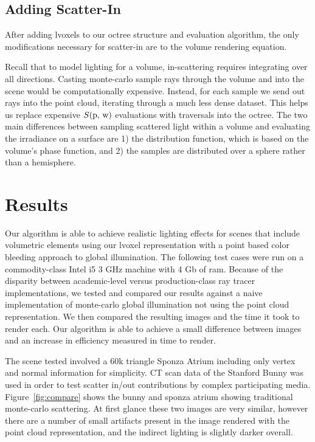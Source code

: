 \documentclass[runningheads]{llncs}
\begin{document}
\subsection{Adding Scatter-In}
\label{scatterin_sec}
After adding lvoxels to our octree structure and evaluation algorithm, the only modifications necessary for scatter-in are to the volume rendering equation.  

Recall that to model lighting for a volume, in-scattering requires integrating over all directions.  Casting monte-carlo sample rays through the volume and into the scene would be computationally expensive.  Instead, for each sample we send out rays into the point cloud, iterating through a much less dense dataset.  This helps us replace expensive $S(\textup{p, w})$ evaluations with traversals into the octree.  The two main differences between sampling scattered light within a volume and evaluating the irradiance on a surface are 1) the distribution function, which is based on the volume's phase function, and 2) the samples are distributed over a sphere rather than a hemisphere.


\section{Results}
Our algorithm is able to achieve realistic lighting effects for scenes that include volumetric elements using our lvoxel representation with a point based color bleeding approach to global illumination.
The following test cases were run on a commodity-class Intel i5 3 GHz machine with 4 Gb of ram.  Because of the disparity between academic-level versus production-class ray tracer implementations, we tested and compared our results against a naive implementation of monte-carlo global illumination not using the point cloud representation.  We then compared the resulting images and the time it took to render each.  Our algorithm is able to achieve a small difference between images and an increase in efficiency measured in time to render.

The scene tested involved a 60k triangle Sponza Atrium including only vertex and normal information for simplicity.  CT scan data of the Stanford Bunny was used in order to test scatter in/out contributions by complex participating media.
Figure~\ref{fig:compare} shows the bunny and sponza atrium showing traditional monte-carlo scattering.  At first glance these two images are very similar, however there are a number of small artifacts present in the image rendered with the point cloud representation, and the indirect lighting is slightly darker overall.
\end{document}
